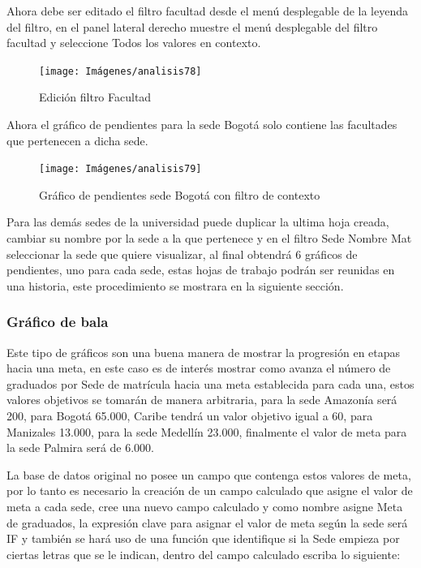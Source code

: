 \documentclass[
]{book}
\begin{document}
Ahora debe ser editado el filtro facultad desde el menú desplegable de la leyenda del filtro, en el panel lateral derecho muestre el menú desplegable del filtro facultad y seleccione Todos los valores en contexto.

\begin{figure}

{\centering \texttt{[image: Imágenes/analisis78]} 

}

\caption{Edición filtro Facultad}\label{fig:facultadcontextobogota-fig}
\end{figure}

Ahora el gráfico de pendientes para la sede Bogotá solo contiene las facultades que pertenecen a dicha sede.

\begin{figure}

{\centering \texttt{[image: Imágenes/analisis79]} 

}

\caption{Gráfico de pendientes sede Bogotá con filtro de contexto}\label{fig:graficopendientecontextobogota-fig}
\end{figure}

Para las demás sedes de la universidad puede duplicar la ultima hoja creada, cambiar su nombre por la sede a la que pertenece y en el filtro Sede Nombre Mat seleccionar la sede que quiere visualizar, al final obtendrá 6 gráficos de pendientes, uno para cada sede, estas hojas de trabajo podrán ser reunidas en una historia, este procedimiento se mostrara en la siguiente sección.

\hypertarget{graficobala}{%
\subsubsection{Gráfico de bala}\label{graficobala}}

Este tipo de gráficos son una buena manera de mostrar la progresión en etapas hacia una meta, en este caso es de interés mostrar como avanza el número de graduados por Sede de matrícula hacia una meta establecida para cada una, estos valores objetivos se tomarán de manera arbitraria, para la sede Amazonía será 200, para Bogotá 65.000, Caribe tendrá un valor objetivo igual a 60, para Manizales 13.000, para la sede Medellín 23.000, finalmente el valor de meta para la sede Palmira será de 6.000.

La base de datos original no posee un campo que contenga estos valores de meta, por lo tanto es necesario la creación de un campo calculado que asigne el valor de meta a cada sede, cree una nuevo campo calculado y como nombre asigne Meta de graduados, la expresión clave para asignar el valor de meta según la sede será IF y también se hará uso de una función que identifique si la Sede empieza por ciertas letras que se le indican, dentro del campo calculado escriba lo siguiente:
\end{document}
